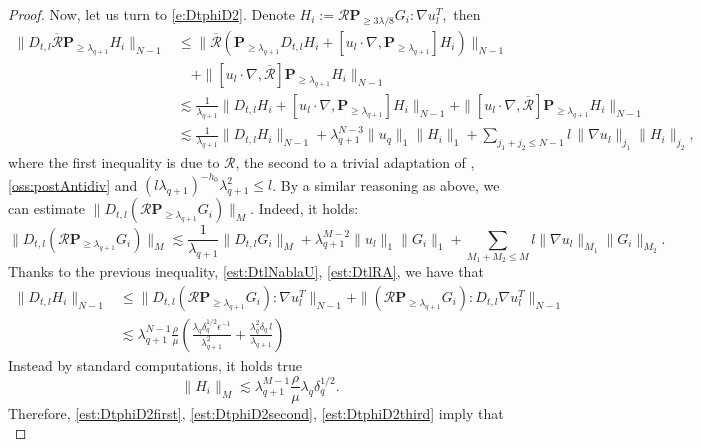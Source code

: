 \documentclass[10pt,a4paper]{amsart}
\numberwithin{equation}{section}
\numberwithin{corollario}{section}
\numberwithin{lemma}{section}
\numberwithin{prop}{section}
\theoremstyle{definition}
\theoremstyle{remark}
\newcommand{\proj}{\mathbf{P}}
\newcommand{\qq}{_{q+1}}
\begin{document}
\begin{proof}
Now, let us turn to \eqref{e:DtphiD2}.
Denote $H_i:= \mathcal{R}\proj_{\geq 3\lambda/8}G_i:\nabla u_l^T,$ then
    \begin{align}\label{est:DtphiD2first}
        \|D_{t,l}\overline{\mathcal{R}}\proj_{\geq \lambda\qq}H_i\|_{N-1}
        &\le 
        \|\overline{\mathcal{R}} \left(\proj_{\geq \lambda\qq}D_{t,l}H_i
        +[u_l\cdot \nabla,\proj_{\geq \lambda\qq}]H_i\right)\|_{N-1}
        \\
        &\quad+\|[u_l\cdot \nabla,\overline{\mathcal{R}}]\proj_{\geq\lambda\qq}H_i\|_{N-1}
        \\
        &\lesssim \frac{1}{\lambda\qq}\|D_{t,l}H_i+[u_l\cdot \nabla,\proj_{\geq \lambda\qq}]H_i\|_{N-1}+\|[u_l\cdot \nabla,\overline{\mathcal{R}}]\proj_{\geq\lambda\qq}H_i\|_{N-1}\\
        &\lesssim \frac{1}{\lambda\qq}\|D_{t,l}H_i\|_{N-1}+\lambda\qq^{N-3}\|u_q\|_1\|H_i\|_1+\sum_{j_1+j_2\le N-1}l\,\|\nabla u_l\|_{j_1}\|H_i\|_{j_2},
    \end{align}
where the first inequality is due to $\mathcal{R}$, the second to a trivial adaptation of \cite[Lemma A.4]{DLK23}, \autoref{oss:postAntidiv} and $(l\lambda\qq)^{-h_0}\lambda^2\qq\le l$.  
By a similar reasoning as above, we can estimate $\|D_{t,l}(\mathcal{R}\proj_{\geq \lambda\qq}G_i)\|_M$. Indeed, it holds:
\[\|D_{t,l}(\mathcal{R}\proj_{\geq \lambda\qq}G_i)\|_M\lesssim\frac1{\lambda\qq}\|D_{t,l}G_i\|_M+\lambda\qq^{M-2}\|u_l\|_1\|G_i\|_1+\sum_{M_1+M_2\le M}l\|\nabla u_l\|_{M_1}\|G_i\|_{M_2}.\]
Thanks to the previous inequality, \eqref{est:DtlNablaU}, \eqref{est:DtlRA}, we have that 
    \begin{align} \label{est:DtphiD2second}
        \|D_{t,l}H_i\|_{N-1}&\le \|D_{t,l}(\mathcal{R}\proj_{\geq \lambda\qq}G_i):\nabla u_l^T\|_{N-1}+\|(\mathcal{R}\proj_{\geq \lambda\qq}G_i):D_{t,l}\nabla u_l^T\|_{N-1}\\
        &\lesssim \lambda^{N-1}\qq\frac{\rho}{\mu}\left(\frac{\lambda_q\delta_q^{1/2}\epsilon^{-1}}{\lambda\qq^2}+\frac{\lambda_q^2\delta_q\,l}{\lambda\qq}\right)
    \end{align}
Instead by standard computations, it holds true
\begin{equation}\label{est:DtphiD2third}
    \|H_i\|_M\lesssim \lambda\qq^{M-1}\frac{\rho}{\mu}\lambda_q\delta_q^{1/2}.
\end{equation}
Therefore, \eqref{est:DtphiD2first}, \eqref{est:DtphiD2second}, \eqref{est:DtphiD2third} imply that
\begin{equation}\label{est:DtphiD2fourth}

\end{equation}
\end{proof}
\end{document}

